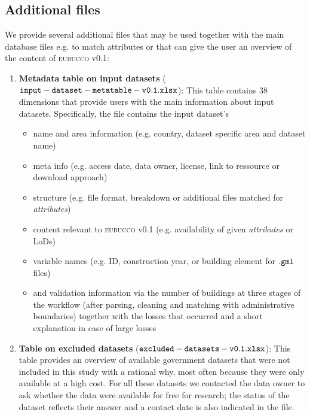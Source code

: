 \documentclass[fleqn,10pt]{wlscirep}
\begin{document}
\subsection*{Additional files}
We provide several additional files that may be used together with the main database files e.g. to match attributes or that can give the user an overview of the content of \textsc{eubucco} v0.1: 


\begin{enumerate}[topsep=1pt]

     \itemsep-0.05em 
    
    \item \textbf{Metadata table on input datasets} (${\tt input-dataset-metatable-v0.1.xlsx}$): This table contains 38 dimensions that provide users with the main information about input datasets. Specifically, the file contains the input dataset's
    
    \begin{itemize}[topsep=1pt]
        \itemsep-0.05em  
        \item name and area information (e.g. country, dataset specific area and dataset name)
        \item meta info (e.g. access date, data owner, license, link to ressource or download approach)
        \item structure (e.g. file format, breakdown or additional files matched for \textit{attributes})
        \item content relevant to \textsc{eubucco} v0.1 (e.g. availability of given \textit{attributes} or LoDs)
        \item variable names (e.g. ID, construction year, or building element for ${\tt .gml}$ files)
        \item and validation information via the number of buildings at three stages of the workflow (after parsing, cleaning and matching with administrative boundaries) together with the losses that occurred and a short explanation in case of large losses
    \end{itemize}

    \item \textbf{Table on excluded datasets} (${\tt excluded-datasets-v0.1.xlsx}$): This table provides an overview of available government datasets that were not included in this study with a rational why, most often because they were only available at a high cost. For all these datasets we contacted the data owner to ask whether the data were available for free for research; the status of the dataset reflects their answer and a contact date is also indicated in the file.  
    

\end{enumerate}
\end{document}
